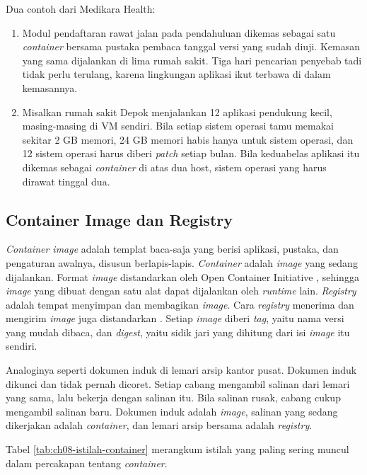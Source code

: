 Dua contoh dari Medikara Health:
\begin{enumerate}
  \item Modul pendaftaran rawat jalan pada pendahuluan dikemas sebagai satu \textit{container}
        bersama pustaka pembaca tanggal versi yang sudah diuji. Kemasan yang sama dijalankan di
        lima rumah sakit. Tiga hari pencarian penyebab tadi tidak perlu terulang, karena
        lingkungan aplikasi ikut terbawa di dalam kemasannya.
  \item Misalkan rumah sakit Depok menjalankan 12 aplikasi pendukung kecil, masing-masing di VM
        sendiri. Bila setiap sistem operasi tamu memakai sekitar 2 GB memori, 24 GB memori habis
        hanya untuk sistem operasi, dan 12 sistem operasi harus diberi \textit{patch} setiap
        bulan. Bila keduabelas aplikasi itu dikemas sebagai \textit{container} di atas dua host,
        sistem operasi yang harus dirawat tinggal dua.
\end{enumerate}

\subsection{Container Image dan Registry}

\textit{Container image} adalah templat baca-saja yang berisi aplikasi, pustaka, dan pengaturan
awalnya, disusun berlapis-lapis. \textit{Container} adalah \textit{image} yang sedang dijalankan.
Format \textit{image} distandarkan oleh Open Container Initiative \cite{c08-oci-image}, sehingga
\textit{image} yang dibuat dengan satu alat dapat dijalankan oleh \textit{runtime} lain.
\textit{Registry} adalah tempat menyimpan dan membagikan \textit{image}. Cara \textit{registry}
menerima dan mengirim \textit{image} juga distandarkan \cite{c08-oci-distribution}. Setiap
\textit{image} diberi \textit{tag}, yaitu nama versi yang mudah dibaca, dan \textit{digest}, yaitu
sidik jari yang dihitung dari isi \textit{image} itu sendiri.

Analoginya seperti dokumen induk di lemari arsip kantor pusat. Dokumen induk dikunci dan tidak
pernah dicoret. Setiap cabang mengambil salinan dari lemari yang sama, lalu bekerja dengan salinan
itu. Bila salinan rusak, cabang cukup mengambil salinan baru. Dokumen induk adalah \textit{image},
salinan yang sedang dikerjakan adalah \textit{container}, dan lemari arsip bersama adalah
\textit{registry}.

Tabel \ref{tab:ch08-istilah-container} merangkum istilah yang paling sering muncul dalam percakapan
tentang \textit{container}.

